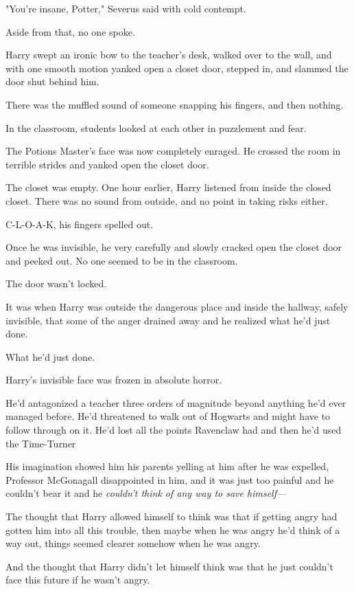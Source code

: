 "You're insane, Potter," Severus said with cold contempt.

Aside from that, no one spoke.

Harry swept an ironic bow to the teacher's desk, walked over to the wall, and
with one smooth motion yanked open a closet door, stepped in, and slammed the
door shut behind him.

There was the muffled sound of someone snapping his fingers, and then nothing.

In the classroom, students looked at each other in puzzlement and fear.

The Potions Master's face was now completely enraged. He crossed the room in
terrible strides and yanked open the closet door.

The closet was empty.
\sbreak
One hour earlier, Harry listened from inside the closed closet. There was no
sound from outside, and no point in taking risks either.

C-L-O-A-K, his fingers spelled out.

Once he was invisible, he very carefully and slowly cracked open the closet
door and peeked out. No one seemed to be in the classroom.

The door wasn't locked.

It was when Harry was outside the dangerous place and inside the hallway,
safely invisible, that some of the anger drained away and he realized what he'd
just done.

What he'd just done.

Harry's invisible face was frozen in absolute horror.

He'd antagonized a teacher three orders of magnitude beyond anything he'd ever
managed before. He'd threatened to walk out of Hogwarts and might have to
follow through on it. He'd lost all the points Ravenclaw had and then he'd used
the Time-Turner{\el}

His imagination showed him his parents yelling at him after he was expelled,
Professor McGonagall disappointed in him, and it was just too painful and he
couldn't bear it and he \emph{couldn't think of any way to save himself---}

The thought that Harry allowed himself to think was that if getting angry had
gotten him into all this trouble, then maybe when he was angry he'd think of a
way out, things seemed clearer somehow when he was angry.

And the thought that Harry didn't let himself think was that he just couldn't
face this future if he wasn't angry.

